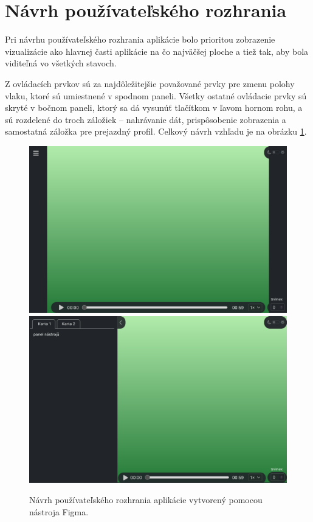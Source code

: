 \section{Návrh používateľského rozhrania}

Pri návrhu používateľského rozhrania aplikácie bolo prioritou zobrazenie vizualizácie ako hlavnej časti aplikácie na čo najväčšej ploche a tiež tak, aby bola viditeľná vo všetkých stavoch.

Z ovládacích prvkov sú za najdôležitejšie považované prvky pre zmenu polohy vlaku, ktoré sú umiestnené v spodnom paneli. Všetky ostatné ovládacie prvky sú skryté v bočnom paneli, ktorý sa dá vysunúť tlačítkom v ľavom hornom rohu, a sú rozdelené do troch záložiek -- nahrávanie dát, prispôsobenie zobrazenia a samostatná záložka pre prejazdný profil. Celkový návrh vzhľadu je na obrázku \ref{fig:navrh_gui}.

\begin{figure}[h]
    \centering
    \includegraphics[width=0.9\linewidth]{text_prace/obrazky-figures/navrh1.pdf}
    \includegraphics[width=0.9\linewidth]{text_prace/obrazky-figures/navrh2.pdf}
    \caption{Návrh používateľského rozhrania aplikácie vytvorený pomocou nástroja Figma.}
    \label{fig:navrh_gui}
\end{figure}

